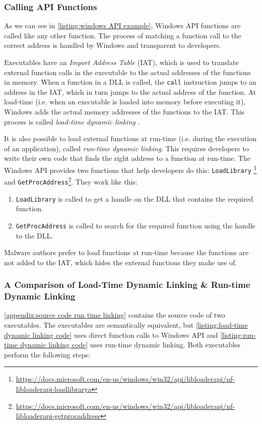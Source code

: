 \subsubsection{Calling API Functions}\label{section:background calling api functions}
As we can see in \autoref{listing:windows API example}, Windows API functions are called like any other function. The process of matching a function call to the correct address is handled by Windows and transparent to developers.

Executables have an \emph{Import Address Table} (IAT), which is used to translate external function calls in the executable to the actual addresses of the functions in memory. When a function in a DLL is called, the \texttt{call} instruction jumps to an address in the IAT, which in turn jumps to the actual address of the function. At load-time (i.e. when an executable is loaded into memory before executing it), Windows adds the actual memory addresses of the functions to the IAT. This process is called \emph{load-time dynamic linking} \cite{load-time-dynamic-linking}.

It is also possible to load external functions at run-time (i.e. during the execution of an application), called \emph{run-time dynamic linking}. This requires developers to write their own code that finds the right address to a function at run-time. The Windows API provides two functions that help developers do this: \texttt{LoadLibrary} \footnote{\tiny \url{https://docs.microsoft.com/en-us/windows/win32/api/libloaderapi/nf-libloaderapi-loadlibrarya}} and \texttt{GetProcAddress}\footnote{\tiny \url{https://docs.microsoft.com/en-us/windows/win32/api/libloaderapi/nf-libloaderapi-getprocaddress}}. They work like this:

\begin{enumerate}
    \item \texttt{LoadLibrary} is called to get a handle on the DLL that contains the required function.
    \item \texttt{GetProcAddress} is called to search for the required function using the handle to the DLL.
\end{enumerate}

Malware authors prefer to load functions at run-time because the functions are not added to the IAT, which hides the external functions they make use of.

\subsubsection{A Comparison of Load-Time Dynamic Linking \& Run-time Dynamic Linking}\label{section:comparison load time run time dynamic linking}
\autoref{appendix:source code run time linking} contains the source code of two executables. The executables are semantically equivalent, but \autoref{listing:load-time dynamic linking code} uses direct function calls to Windows API and \autoref{listing:run-time dynamic linking code} uses run-time dynamic linking. Both executables perform the following steps:


